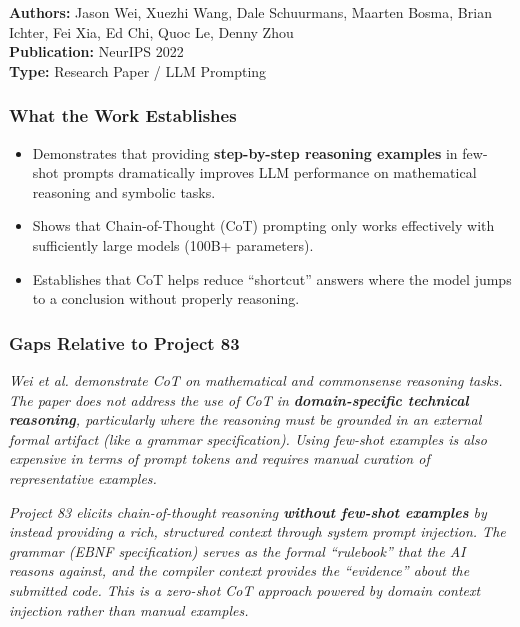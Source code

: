 \documentclass[a4paper,11pt]{article}
\newcommand{\papergap}[1]{%
  \begin{tcolorbox}[colback=red!5!white, colframe=red!60!black, title={Research Gap Identified}]
  \textit{#1}
  \end{tcolorbox}
}
\newcommand{\oursolution}[1]{%
  \begin{tcolorbox}[colback=green!5!white, colframe=green!60!black, title={How Project 83 Solves This Gap}]
  \textit{#1}
  \end{tcolorbox}
}
\begin{document}
\begin{tcolorbox}[colback=gray!5, colframe=gray!40]
\textbf{Authors:} Jason Wei, Xuezhi Wang, Dale Schuurmans, Maarten Bosma, Brian Ichter, Fei Xia, Ed Chi, Quoc Le, Denny Zhou \\
\textbf{Publication:} NeurIPS 2022 \\
\textbf{Type:} Research Paper / LLM Prompting
\end{tcolorbox}

\subsubsection{What the Work Establishes}

\begin{itemize}
    \item Demonstrates that providing \textbf{step-by-step reasoning examples} in few-shot prompts dramatically improves LLM performance on mathematical reasoning and symbolic tasks.
    \item Shows that Chain-of-Thought (CoT) prompting only works effectively with sufficiently large models (100B+ parameters).
    \item Establishes that CoT helps reduce ``shortcut'' answers where the model jumps to a conclusion without properly reasoning.
\end{itemize}

\subsubsection{Gaps Relative to Project 83}

\papergap{Wei et al. demonstrate CoT on mathematical and commonsense reasoning tasks. The paper does not address the use of CoT in \textbf{domain-specific technical reasoning}, particularly where the reasoning must be grounded in an external formal artifact (like a grammar specification). Using few-shot examples is also expensive in terms of prompt tokens and requires manual curation of representative examples.}

\oursolution{Project 83 elicits chain-of-thought reasoning \textbf{without few-shot examples} by instead providing a rich, structured context through system prompt injection. The grammar (EBNF specification) serves as the formal ``rulebook'' that the AI reasons against, and the compiler context provides the ``evidence'' about the submitted code. This is a zero-shot CoT approach powered by domain context injection rather than manual examples.}
\end{document}
